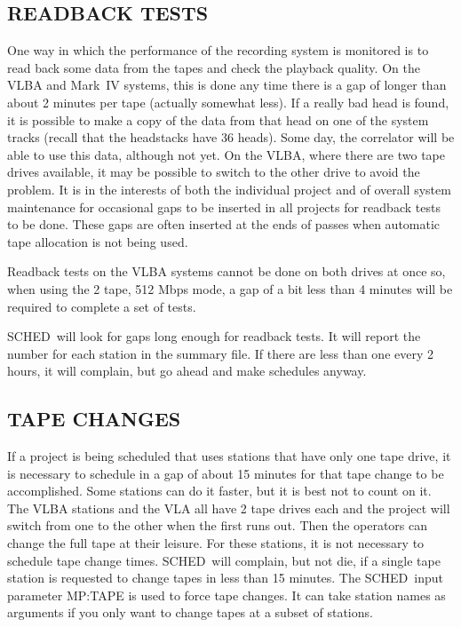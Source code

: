 \documentclass{report}
\newcommand{\schedb}{{\sc SCHED~}}
\begin{document}
\subsection{\label{SSSEC:READBACK}READBACK TESTS}

One way in which the performance of the recording system is monitored
is to read back some data from the tapes and check the playback
quality.  On the VLBA and Mark~IV systems, this is done any time there
is a gap of longer than about 2 minutes per tape (actually somewhat
less).  If a really bad head is found, it is possible to make a copy
of the data from that head on one of the system tracks (recall that
the headstacks have 36 heads).  Some day, the correlator will be able
to use this data, although not yet.  On the VLBA, where there are two
tape drives available, it may be possible to switch to the other drive
to avoid the problem.  It is in the interests of both the individual
project and of overall system maintenance for occasional gaps to be
inserted in all projects for readback tests to be done.  These gaps
are often inserted at the ends of passes when automatic tape
allocation is not being used.

Readback tests on the VLBA systems cannot be done on both drives at
once so, when using the 2 tape, 512 Mbps mode, a gap of a bit less
than 4 minutes will be required to complete a set of tests.

\schedb will look for gaps long enough for readback tests.  It will
report the number for each station in the summary file.  If
there are less than one every 2 hours, it will complain, but go ahead
and make schedules anyway.

\subsection{\label{SSSEC:TAPECHANGE}TAPE CHANGES}

If a project is being scheduled that uses stations that have only one
tape drive, it is necessary to schedule in a gap of about 15 minutes
for that tape change to be accomplished.  Some stations can do it
faster, but it is best not to count on it.  The VLBA stations and the
VLA all have 2 tape drives each and the project will switch from one
to the other when the first runs out.  Then the operators can change
the full tape at their leisure.  For these stations, it is not
necessary to schedule tape change times.  \schedb will complain, but
not die, if a single tape station is requested to change tapes in
less than 15 minutes.  The \schedb input parameter 
{MP:TAPE} is used to force tape changes.  It can take station names
as arguments if you only want to change tapes at a subset of stations.
\end{document}
